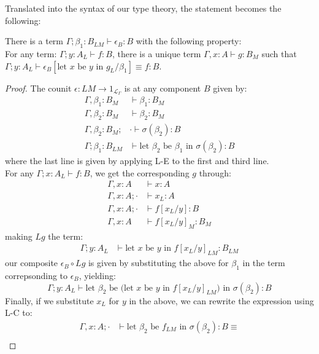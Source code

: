 Translated into the syntax of our type theory, the statement becomes the following:\\
\begin{thm}[$L \dashv M$]
There is a term $\Gamma; \beta_1 : B_{LM} \vdash \epsilon_B: B$ with the following property:\\
For any term: $\Gamma; y : A_L \vdash f : B$, there is a unique term $\Gamma, x : A \vdash g : B_{M}$ such that $\Gamma; y : A_L \vdash \epsilon_B[\text{let $x$ be $y$ in }g_L/\beta_1] \equiv f : B$.\\
\begin{proof}
 The counit $\epsilon : LM \to 1_{\mathcal{L}_{\Gamma}}$ is at any component $B$ given by:
 \[
  \begin{split}
    \Gamma, \beta_1 : B_{M} &\vdash \beta_1 : B_{M}\\
    \Gamma, \beta_2 : B_{M} &\vdash \beta_2 : B_{M}\\
    \Gamma, \beta_2 : B_{M}; &\cdot \vdash \sigma(\beta_2) : B\\
    \Gamma; \beta_1 : B_{LM} &\vdash \text{let $\beta_2$ be $\beta_1$ in }\sigma(\beta_2) : B 
  \end{split}
\]
  where the last line is given by applying L-E to the first and third line.\\
  For any $\Gamma; x : A_L \vdash f : B$, we get the corresponding $g$ through:
  \[
    \begin{split}
      \Gamma, x : A &\vdash x : A\\
      \Gamma, x : A; \cdot &\vdash x_L : A\\
      \Gamma, x : A; \cdot &\vdash f[x_L/y] : B\\
      \Gamma, x : A &\vdash f[x_L/y]_M : B_M
      \end{split}
    \]
    making $Lg$ the term:
\[
  \begin{split}
    \Gamma; y : A_L &\vdash \text{let $x$ be $y$ in } f[x_L/y]_{LM} : B_{LM}
  \end{split}
\]
our composite $\epsilon_B \circ Lg$ is given by substituting the above for $\beta_1$ in the term correpsonding to $\epsilon_B$, yielding:
\[
  \Gamma; y : A_L \vdash \text{let $\beta_2$ be (let $x$ be $y$ in $f[x_L/y]_{LM}$) in }\sigma(\beta_2) : B
\]
Finally, if we substitute $x_L$ for $y$ in the above, we can rewrite the expression using L-C to:
\[
  \begin{split}
    \Gamma, x : A; \cdot &\vdash \text{let $\beta_2$ be $f_{LM}$ in }\sigma(\beta_2) : B \equiv \\

\end{split}\]
\end{proof}
\end{thm}
